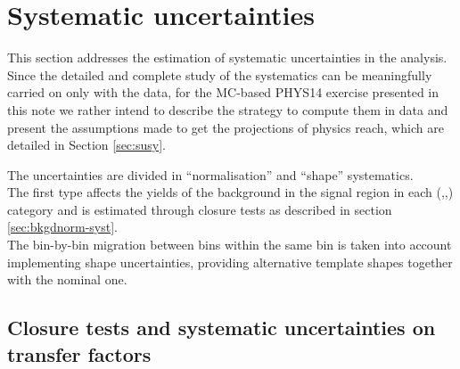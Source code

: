 \section{Systematic uncertainties}
\label{sec:systematics}
This section addresses the estimation of systematic uncertainties in the analysis.
Since the detailed and complete study of the systematics can be meaningfully carried on only with the data, 
for the MC-based PHYS14 exercise presented in this note we rather intend to describe the strategy to compute them 
in data and present the assumptions made to get the projections of physics reach, which are detailed in Section \ref{sec:susy}. 

The uncertainties are divided in ``normalisation'' and ``shape'' systematics. \\
The first type affects the yields of the background in the signal region in each (\nb,\njet,\HT) 
category and is estimated through closure tests as described in section \ref{sec:bkgdnorm-syst}. \\
The bin-by-bin migration between \mht bins within the same \HT bin is taken into account implementing 
shape uncertainties, providing alternative template \mht shapes together with the nominal one.

%

\subsection{Closure tests and systematic uncertainties on transfer factors\label{sec:bkgdnorm-syst}}

